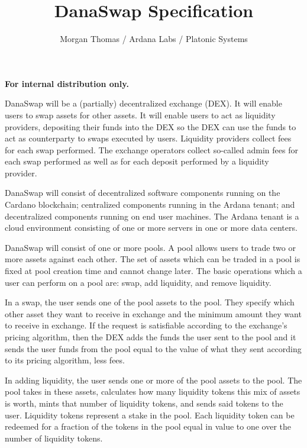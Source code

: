 \documentclass[12pt]{article}
\title{DanaSwap Specification}
\author{Morgan Thomas / Ardana Labs / Platonic Systems}
\begin{document}
\maketitle

\begin{center}
	\textbf{For internal distribution only.}
\end{center}


DanaSwap will be a (partially) decentralized exchange (DEX). It will enable users to swap assets for other assets. It will enable users to act as liquidity providers, depositing their funds into the DEX so the DEX can use the funds to act as counterparty to swaps executed by users. Liquidity providers collect fees for each swap performed. The exchange operators collect so-called admin fees for each swap performed as well as for each deposit performed by a liquidity provider.

DanaSwap will consist of decentralized software components running on the Cardano blockchain; centralized components running in the Ardana tenant; and decentralized components running on end user machines. The Ardana tenant is a cloud environment consisting of one or more servers in one or more data centers.

DanaSwap will consist of one or more pools. A pool allows users to trade two or more assets against each other. The set of assets which can be traded in a pool is fixed at pool creation time and cannot change later. The basic operations which a user can perform on a pool are: swap, add liquidity, and remove liquidity.

In a swap, the user sends one of the pool assets to the pool. They specify which other asset they want to receive in exchange and the minimum amount they want to receive in exchange. If the request is satisfiable according to the exchange's pricing algorithm, then the DEX adds the funds the user sent to the pool and it sends the user funds from the pool equal to the value of what they sent according to its pricing algorithm, less fees.

In adding liquidity, the user sends one or more of the pool assets to the pool. The pool takes in these assets, calculates how many liquidity tokens this mix of assets is worth, mints that number of liquidity tokens, and sends said tokens to the user. Liquidity tokens represent a stake in the pool. Each liquidity token can be redeemed for a fraction of the tokens in the pool equal in value to one over the number of liquidity tokens.
\end{document}
